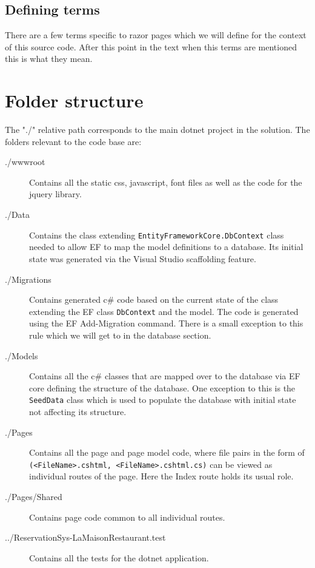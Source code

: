 \documentclass[12pt, a4paper]{article}
\begin{document}
\subsection{Defining terms}
There are a few terms specific to razor pages which we will define for the context of this source code. After this point in the text when this terms are mentioned this is what they mean.

\vspace{-1.5cm}
\glsaddall
\printglossary[style=altlist,title={},toctitle={}]

\section{Folder structure}
The "./" relative path corresponds to the main dotnet project in the solution.
The folders relevant to the code base are:
\begin{description}
    \item[./wwwroot] Contains all the static css, javascript, font files as well as the code for the jquery library.
    \item[./Data] Contains the class extending \texttt{EntityFrameworkCore.DbContext} class needed to allow EF to map the model definitions to a database. Its initial state was generated via the Visual Studio scaffolding feature. 
    \item[./Migrations] Contains generated c\# code based on the current state of the class extending the EF class \texttt{DbContext} and the model. The code is generated using the EF Add-Migration command. There is a small exception to this rule which we will get to in the database section.
    \item[./Models] Contains all the c\# classes that are mapped over to the database via EF core defining the structure of the database. One exception to this is the \texttt{SeedData} class which is used to populate the database with initial state not affecting its structure.
    \item[./Pages] Contains all the page and page model code, where file pairs in the form of \texttt{(<FileName>.cshtml, <FileName>.cshtml.cs)} can be viewed as individual routes of the page. Here the Index route holds its usual role.
    \item[./Pages/Shared] Contains page code common to all individual routes. 
    \item[../ReservationSys-LaMaisonRestaurant.test] Contains all the tests for the dotnet application.
\end{description}
\end{document}
